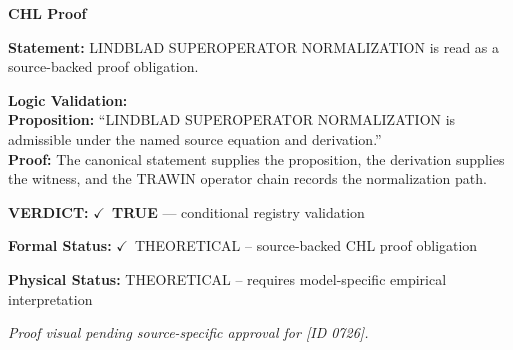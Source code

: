 \vspace{0.45em}
\noindent\textbf{CHL Proof}\par
\textbf{Statement:} LINDBLAD SUPEROPERATOR NORMALIZATION is read as a source-backed proof obligation.

\textbf{Logic Validation:}\\
\textbf{Proposition:} ``LINDBLAD SUPEROPERATOR NORMALIZATION is admissible under the named source equation and derivation.''\\
\textbf{Proof:} The canonical statement supplies the proposition, the derivation supplies the witness, and the TRAWIN operator chain records the normalization path.

\textbf{VERDICT:} \ensuremath{\checkmark}\ \textbf{TRUE} --- conditional registry validation

\textbf{Formal Status:} \ensuremath{\checkmark}\ THEORETICAL -- source-backed CHL proof obligation

\textbf{Physical Status:} THEORETICAL -- requires model-specific empirical interpretation
\par\vspace{0.45em}
\par
\vfill
\begingroup\footnotesize\itshape
Proof visual pending source-specific approval for [ID 0726].
\par\endgroup
\vfill
\endgroup
\endgroup
